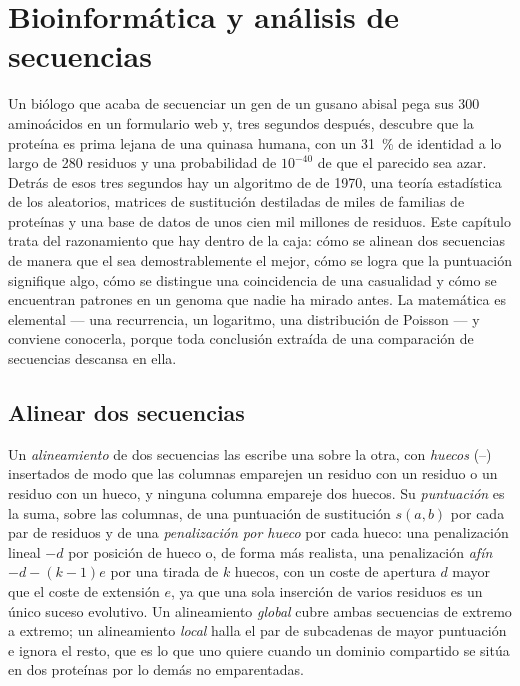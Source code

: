 \chapter{Bioinformática y análisis de secuencias}\label{ch:b3:bioinformatics}

Un biólogo que acaba de secuenciar un gen de un gusano abisal pega sus
\num{300} aminoácidos en un formulario web y, tres segundos después,
descubre que la proteína es prima lejana de una quinasa humana, con un
\qty{31}{\%} de identidad a lo largo de \num{280} residuos y una
probabilidad de $10^{-40}$ de que el parecido sea azar. Detrás de esos
tres segundos hay un algoritmo de  de 1970, una
teoría estadística de los  aleatorios, matrices de
sustitución destiladas de miles de familias de proteínas y una base de
datos de unos cien mil millones de residuos. Este capítulo trata del
razonamiento que hay dentro de la caja: cómo se alinean dos secuencias de
manera que el  sea demostrablemente el mejor, cómo se logra
que la puntuación signifique algo, cómo se distingue una coincidencia de
una casualidad y cómo se encuentran patrones en un genoma que nadie ha
mirado antes. La matemática es elemental --- una recurrencia, un
logaritmo, una distribución de Poisson --- y conviene conocerla, porque
toda conclusión extraída de una comparación de secuencias descansa en ella.

\section{Alinear dos secuencias}

\begin{definition}\label{def:b3:bioinformatics:alignment}
Un \emph{alineamiento} de dos secuencias las escribe una sobre la otra,
con \emph{huecos} (--) insertados de modo que las columnas emparejen un
residuo con un residuo o un residuo con un hueco, y ninguna columna
empareje dos huecos. Su \emph{puntuación} es la suma, sobre las columnas,
de una puntuación de sustitución $s(a,b)$ por cada par de residuos y de
una \emph{penalización por hueco} por cada hueco: una penalización lineal
$-d$ por posición de hueco o, de forma más realista, una penalización
\emph{afín} $-d - (k-1)e$ por una tirada de $k$ huecos, con un coste de
apertura $d$ mayor que el coste de extensión $e$, ya que una sola
inserción de varios residuos es un único suceso evolutivo. Un
alineamiento \emph{global} cubre ambas secuencias de extremo a extremo;
un alineamiento \emph{local} halla el par de subcadenas de mayor
puntuación e ignora el resto, que es lo que uno quiere cuando un dominio
compartido se sitúa en dos proteínas por lo demás no emparentadas.
\end{definition}

